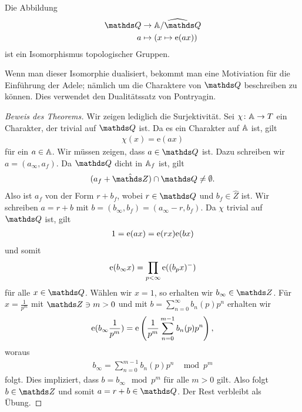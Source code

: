 \begin{thm}
Die Abbildung
\begin{align*}
\Q &\to \widehat{\A/\Q}\\
a &\mapsto (x \mapsto \mathrm{e}(ax))
\end{align*}
ist ein Isomorphismus topologischer Gruppen.
\end{thm}
\begin{bem}
Wenn man dieser Isomorphie dualisiert, bekommt man eine Motiviation für die Einführung der Adele; nämlich um die Charaktere von $\Q$ beschreiben zu können. Dies verwendet den Dualitätssatz von Pontryagin.
\end{bem}
\begin{proof}[Beweis des Theorems]
Wir zeigen lediglich die Surjektivität.
Sei $\chi \colon \mathbb{A} \to T$ ein Charakter, der trivial auf $\Q$ ist.
Da es ein Charakter auf $\mathbb{A}$ ist, gilt
\begin{align*}
\chi(x)=\mathrm{e}(ax)
\end{align*}
für ein $a\in \mathbb{A}$.
Wir müssen zeigen, dass $a\in \Q$ ist. Dazu schreiben wir $a=(a_\infty,a_f)$.
Da $\Q$ dicht in $\mathbb{A}_f$ ist, gilt
\begin{align*}
(a_f+\hat{\Z})\cap \Q \not=\emptyset.
\end{align*}
Also ist $a_f$ von der Form $r+b_f$, wobei $r\in \Q$ und $b_f\in \hat{Z}$ ist.
Wir schreiben $a=r+b$ mit $b=(b_\infty,b_f)=(a_\infty-r,b_f)$.
Da $\chi$ trivial auf $\Q$ ist, gilt
\begin{align*}
1=\mathrm{e}(ax)=\mathrm{e}(rx)\mathrm{e}(bx)
\end{align*}
und somit
\begin{align*}
\mathrm{e}(b_\infty x)=\prod_{p<\infty} \mathrm{e}((b_px)^-)
\end{align*}
für alle $x\in \Q$. Wählen wir $x=1$, so erhalten wir $b_\infty \in \Z$.
Für $x=\frac{1}{p^m}$ mit $\Z \ni m>0$ und mit $b=\sum_{n=0}^\infty b_n(p)p^n$ erhalten wir
\begin{align*}
\mathrm{e}(b_\infty \frac{1}{p^m})=\mathrm{e}\left(\frac{1}{p^m}\sum_{n=0}^{m-1} b_n(p)p^n\right),
\end{align*}
woraus
\begin{align*}
b_\infty =\sum_{n=0}^{m-1} b_n(p)p^n~~\mod p^m
\end{align*}
folgt.
Dies impliziert, dass $b=b_\infty \mod p^m$ für alle $m>0$ gilt.
Also folgt $b \in \Z$ und somit $a=r+b \in \Q$.
Der Rest verbleibt als Übung.
\end{proof}


